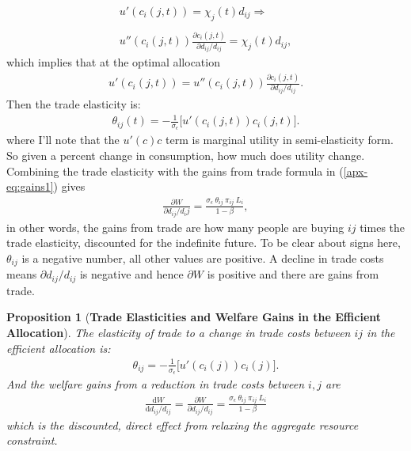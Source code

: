\documentclass[12pt,pdftex]{article}
\newtheorem{prp}{Proposition}
\begin{document}
\begin{onehalfspacing}
\begin{align}
u'(c_{i}(j,t) ) = \chi_{j}(t) d_{ij} \Rightarrow \\
\nonumber \\
u''(c_{i}(j,t))\frac{\partial c_{i}(j,t)}{\partial d_{ij} / d_{ij}} = \chi_{j}(t)d_{ij},
\end{align}
which implies that at the optimal allocation
\begin{align}
u'(c_{i}(j,t) ) =  u''(c_{i}(j,t))\frac{\partial c_{i}(j,t)}{\partial d_{ij} / d_{ij}}. \label{apx-eq:muc-fact}
\end{align}
Then the trade elasticity is:
\begin{align}
\theta_{ij}(t) =  -\frac{1}{\sigma_{\epsilon}} \bigg [ u'(c_{i}(j,t)) c_{i}(j,t) \bigg].
\end{align}
where I'll note that the $u'(c)c$ term is marginal utility in semi-elasticity form. So given a percent change in consumption, how much does utility change. Combining the trade elasticity with the gains from trade formula in (\ref{apx-eq:gains1}) gives
\begin{align}
\frac{\partial W}{\partial d_{ij} / d_ij} =  \frac{\sigma_{\epsilon} \ \theta_{ij} \ \pi_{ij} \ L_{i}}{1-\beta} ,
\end{align}
in other words, the gains from trade are how many people are buying $ij$ times the trade elasticity, discounted for the indefinite future. To be clear about signs here, $\theta_{ij}$ is a negative number, all other values are positive. A decline in trade costs means $\partial d_{ij} / d_{ij}$ is negative and hence $\partial W$ is positive and there are gains from trade.

\begin{prp}[\textbf{Trade Elasticities and Welfare Gains in the Efficient Allocation}]\label{apx-prp:gains-efficient-allocation} The elasticity of trade to a change in trade costs between $ij$ in the efficient allocation is:
\begin{align}
\theta_{ij} =  -\frac{1}{\sigma_{\epsilon}} \bigg [ u'(c_{i}(j)) c_{i}(j) \bigg]. \label{apx-eq:eff-trade-elasticity}
\end{align}
And the welfare gains from a reduction in trade costs between $i,j$ are
\begin{align}
\frac{\mathrm{d} W}{\mathrm{d} d_{ij} / d_{ij}} = \frac{\partial W}{\partial d_{ij} / d_{ij}} =  \frac{\sigma_{\epsilon} \ \theta_{ij} \ \pi_{ij} \ L_i}{1-\beta}
\label{apx-eq:eff-trade-gains}
\end{align}
which is the discounted, direct effect from relaxing the aggregate resource constraint.
\end{prp}


\end{onehalfspacing}
\end{document}
